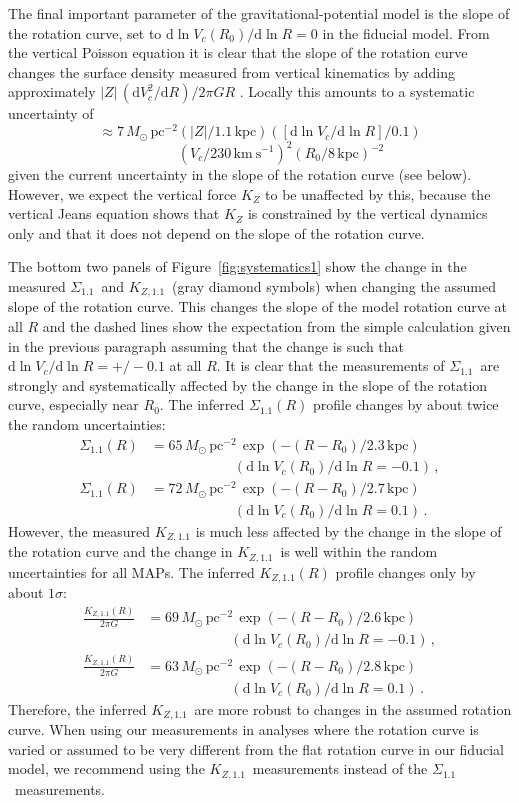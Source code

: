 \documentclass{emulateapj}
\newcommand{\dd}{\mathrm{d}}
\renewcommand{\figurename}{Figure}
\newcommand{\map}{MAP}
\newcommand{\kpc}{\ensuremath{\,\mathrm{kpc}}}
\newcommand{\pc}{\ensuremath{\,\mathrm{pc}}}
\newcommand{\kms}{\ensuremath{\,\mathrm{km\ s}^{-1}}}
\newcommand{\sigoneone}{\ensuremath{\Sigma_{1.1}}}
\newcommand{\kzoneone}{\ensuremath{K_{Z,1.1}}}
\begin{document}
The final important parameter of the gravitational-potential model is
the slope of the rotation curve, set to $\dd \ln V_c(R_0) / \dd \ln R
= 0$ in the fiducial model. From the vertical Poisson equation it is
clear that the slope of the rotation curve changes the surface density
measured from vertical kinematics by adding approximately $|Z|\,(\dd
V^2_c / \dd R)/2\pi G R$ \citep{Kuijken89a,BovyTremaine}. Locally this
amounts to a systematic uncertainty of 
\[\approx 7\,M_\odot\pc^{-2}
(|Z| / 1.1\kpc) ([\dd \ln V_c / \dd \ln R]/0.1)\]\[\qquad \quad (V_c / 230\kms)^2(R_0 /
8\kpc)^{-2}\]
 given the current uncertainty in the slope of the
rotation curve (see below). However, we expect the vertical force
$K_Z$ to be unaffected by this, because the vertical Jeans equation
shows that $K_Z$ is constrained by the vertical dynamics only and that
it does not depend on the slope of the rotation curve.

The bottom two panels of \figurename~\ref{fig:systematics1} show the
change in the measured \sigoneone\ and \kzoneone\ (gray diamond
symbols) when changing the assumed slope of the rotation curve. This
changes the slope of the model rotation curve at all $R$ and the
dashed lines show the expectation from the simple calculation given in
the previous paragraph assuming that the change is such that $\dd \ln
V_c / \dd \ln R = +/- 0.1$ at all $R$. It is clear that the
measurements of \sigoneone\ are strongly and systematically affected
by the change in the slope of the rotation curve, especially near
$R_0$. The inferred $\sigoneone(R)$ profile changes by about twice the
random uncertainties:
\begin{align}
  \sigoneone(R) & = 65\,M_\odot\,\mathrm{pc}^{-2}\,\exp\left(-(R-R_0)/ 2.3\kpc\right)\nonumber\\& \qquad \qquad \qquad (\dd \ln V_c(R_0) / \dd \ln R= -0.1)\,,\\
  \sigoneone(R) & = 72\,M_\odot\,\mathrm{pc}^{-2}\,\exp\left(-(R-R_0)/ 2.7\kpc\right)\nonumber\\ & \qquad \qquad \qquad (\dd \ln V_c(R_0) / \dd \ln R= 0.1)\,.
\end{align}
However, the measured $\kzoneone$ is much less affected by the change
in the slope of the rotation curve and the change in \kzoneone\ is
well within the random uncertainties for all \map s. The inferred
$\kzoneone(R)$ profile changes only by about $1\sigma$:
\begin{align}
  \frac{\kzoneone(R)}{2\pi G} & = 69\,M_\odot\,\mathrm{pc}^{-2}\,\exp\left(-(R-R_0)/ 2.6\kpc\right)\nonumber\\& \qquad \qquad \qquad (\dd \ln V_c(R_0) / \dd \ln R = -0.1)\,,\\
  \frac{\kzoneone(R)}{2\pi G} & = 63\,M_\odot\,\mathrm{pc}^{-2}\,\exp\left(-(R-R_0)/ 2.8\kpc\right)\nonumber\\& \qquad \qquad \qquad (\dd \ln V_c(R_0) / \dd \ln R = 0.1)\,.
\end{align}
Therefore, the inferred \kzoneone\ are more robust to changes in the
assumed rotation curve. When using our measurements in analyses where
the rotation curve is varied or assumed to be very different from the
flat rotation curve in our fiducial model, we recommend using the
\kzoneone\ measurements instead of the \sigoneone\ measurements.
\end{document}
